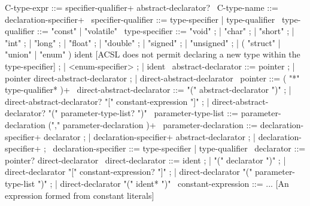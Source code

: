 \begin{syntax}
C-type-expr ::= specifier-qualifier+ abstract-declarator?
\
C-type-name ::= declaration-specifier+
\
specifier-qualifier ::= type-specifier | type-qualifier
\
type-qualifier ::= "const" | "volatile"
\
type-specifier ::= "void" ;
                   | "char" ;
                   | "short" ;
                   | "int" ;
                   | "long" ;
                   | "float" ;
                   | "double" ;
                   | "signed" ;
                   | "unsigned" ;
                   | ( "struct" | "union" | "enum" ) ident [ACSL does not permit declaring a new type within the type-specifier] ;
                   | <enum-specifier> ;
                   | ident
\
abstract-declarator ::= pointer ;
| pointer direct-abstract-declarator ;
| direct-abstract-declarator
\
pointer ::= ( "*" type-qualifier* )+
\
direct-abstract-declarator ::= "(" abstract-declarator ")" ; 
| direct-abstract-declarator? "[" constant-expression "]" ;
| direct-abstract-declarator? "(" parameter-type-list? ")"
\
parameter-type-list ::= parameter-declaration ("," parameter-declaration )+
\
parameter-declaration ::= declaration-specifier+ declarator ;
                          | declaration-specifier+ abstract-declarator ;
                          | declaration-specifier+ ;
\
declaration-specifier ::= type-specifier | type-qualifier
\
declarator ::= pointer? direct-declarator
\
direct-declarator ::= ident ;
                      | "(" declarator ")" ;
                      | direct-declarator "[" constant-expression? "]" ;
                      | direct-declarator "(" parameter-type-list ")" ;
                      | direct-declarator "(" ident* ")"
\
constant-expression ::=  ... [An expression formed from constant literals]
\end{syntax}
